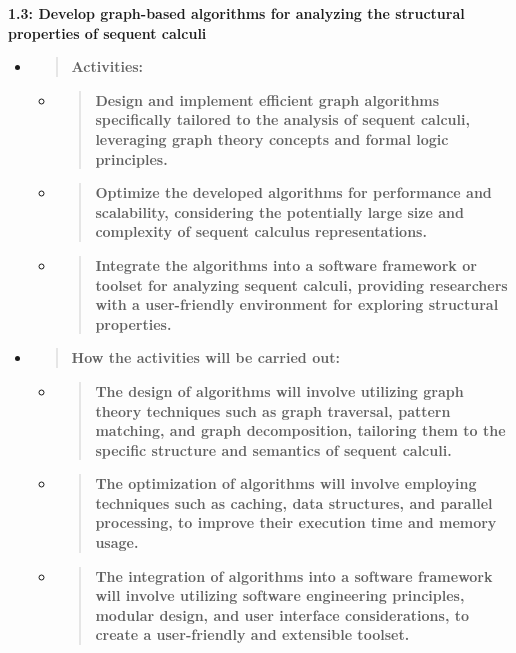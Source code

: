 \textbf{1.3: Develop graph-based algorithms for analyzing the structural
properties of sequent calculi}

\begin{itemize}
\item
  \begin{quote}
  \textbf{Activities:\\
  }
  \end{quote}

  \begin{itemize}
  \item
    \begin{quote}
    \textbf{Design and implement efficient graph algorithms specifically
    tailored to the analysis of sequent calculi, leveraging graph theory
    concepts and formal logic principles.}
    \end{quote}
  \item
    \begin{quote}
    \textbf{Optimize the developed algorithms for performance and
    scalability, considering the potentially large size and complexity
    of sequent calculus representations.}
    \end{quote}
  \item
    \begin{quote}
    \textbf{Integrate the algorithms into a software framework or
    toolset for analyzing sequent calculi, providing researchers with a
    user-friendly environment for exploring structural properties.}
    \end{quote}
  \end{itemize}
\item
  \begin{quote}
  \textbf{How the activities will be carried out:\\
  }
  \end{quote}

  \begin{itemize}
  \item
    \begin{quote}
    \textbf{The design of algorithms will involve utilizing graph theory
    techniques such as graph traversal, pattern matching, and graph
    decomposition, tailoring them to the specific structure and
    semantics of sequent calculi.}
    \end{quote}
  \item
    \begin{quote}
    \textbf{The optimization of algorithms will involve employing
    techniques such as caching, data structures, and parallel
    processing, to improve their execution time and memory usage.}
    \end{quote}
  \item
    \begin{quote}
    \textbf{The integration of algorithms into a software framework will
    involve utilizing software engineering principles, modular design,
    and user interface considerations, to create a user-friendly and
    extensible toolset.}
    \end{quote}
  \end{itemize}
\end{itemize}

